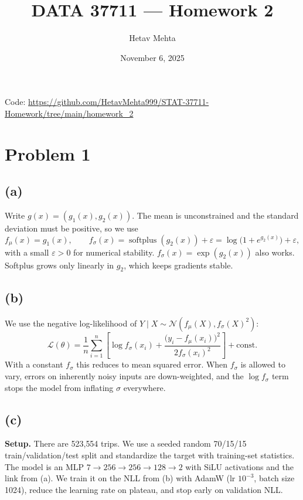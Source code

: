\documentclass[11pt]{article}
\title{DATA 37711 --- Homework 2}
\author{Hetav Mehta}
\date{November 6, 2025}
\begin{document}
\maketitle

\begin{center}
Code: \url{https://github.com/HetavMehta999/STAT-37711-Homework/tree/main/homework_2}
\end{center}

\section*{Problem 1}

\subsection*{(a)}
Write $g(x) = (g_1(x), g_2(x))$. The mean is unconstrained and the standard deviation must be positive, so we use
\[
  f_\mu(x) = g_1(x), \qquad f_\sigma(x) = \operatorname{softplus}(g_2(x)) + \varepsilon = \log\!\bigl(1+e^{g_2(x)}\bigr) + \varepsilon,
\]
with a small $\varepsilon>0$ for numerical stability. $f_\sigma(x)=\exp(g_2(x))$ also works. Softplus grows only linearly in $g_2$, which keeps gradients stable.

\subsection*{(b)}
We use the negative log-likelihood of $Y\mid X \sim \mathcal N(f_\mu(X), f_\sigma(X)^2)$:
\[
  \mathcal L(\theta) = \frac1n\sum_{i=1}^n \left[ \log f_\sigma(x_i) + \frac{\bigl(y_i - f_\mu(x_i)\bigr)^2}{2 f_\sigma(x_i)^2} \right] + \text{const}.
\]
With a constant $f_\sigma$ this reduces to mean squared error. When $f_\sigma$ is allowed to vary, errors on inherently noisy inputs are down-weighted, and the $\log f_\sigma$ term stops the model from inflating $\sigma$ everywhere.

\subsection*{(c)}
\textbf{Setup.} There are 523{,}554 trips. We use a seeded random 70/15/15 train/validation/test split and standardize the target with training-set statistics. The model is an MLP
$7\to256\to256\to128\to2$ with SiLU activations and the link from (a). We train it on the NLL from (b) with AdamW (lr $10^{-3}$, batch size 1024), reduce the learning rate on plateau, and stop early
on validation NLL.
\end{document}
